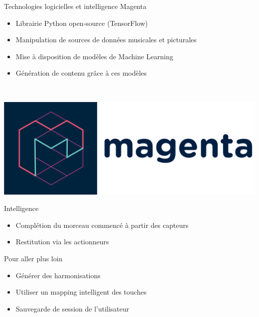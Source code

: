 \documentclass[11pt]{beamer}
\begin{document}
\begin{frame}{Technologies logicielles et intelligence}
Magenta
\begin{itemize}
    \item Librairie Python open-source (TensorFlow) 
    \item Manipulation de sources de données musicales et picturales
    \item Mise à disposition de modèles de Machine Learning
    \item Génération de contenu grâce à ces modèles
\end{itemize}
~\\
\begin{center}
    \includegraphics[scale=0.05]{logo-magenta.png}
\end{center}

Intelligence
\begin{itemize}
    \item Complétion du morceau commencé à partir des capteurs
    \item Restitution via les actionneurs
\end{itemize}
    
\end{frame}

\begin{frame}{Pour aller plus loin}
\begin{itemize}
    \item Générer des harmonisations
    \item Utiliser un mapping intelligent des touches
    \item Sauvegarde de session de l'utilisateur
\end{itemize}
\end{frame}
\end{document}
